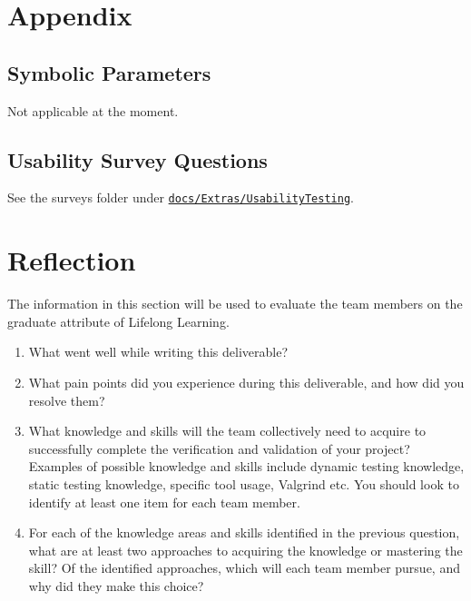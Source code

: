 \documentclass[12pt, titlepage]{article}
\begin{document}
  \begin{appendices}

    \section{Appendix}


    \subsection{Symbolic Parameters}

    Not applicable at the moment.

    \subsection{Usability Survey Questions} \label{A.2}

    See the surveys folder under \href{https://github.com/ssm-lab/capstone--source-code-optimizer/tree/main/docs/Extras/UsabilityTesting/surveys}{\texttt{docs/Extras/UsabilityTesting}}.

    \newpage{}
    \section{Reflection}


    The information in this section will be used to evaluate the team
    members on the
    graduate attribute of Lifelong Learning.

    

    \begin{enumerate}
      \item What went well while writing this deliverable?
      \item What pain points did you experience during this deliverable, and how
        did you resolve them?
      \item What knowledge and skills will the team collectively need
        to acquire to
        successfully complete the verification and validation of your project?
        Examples of possible knowledge and skills include dynamic
        testing knowledge,
        static testing knowledge, specific tool usage, Valgrind etc.
        You should look to
        identify at least one item for each team member.
      \item For each of the knowledge areas and skills identified in
        the previous
        question, what are at least two approaches to acquiring the knowledge or
        mastering the skill?  Of the identified approaches, which will each team
        member pursue, and why did they make this choice?
    \end{enumerate}


\end{appendices}
\end{document}
